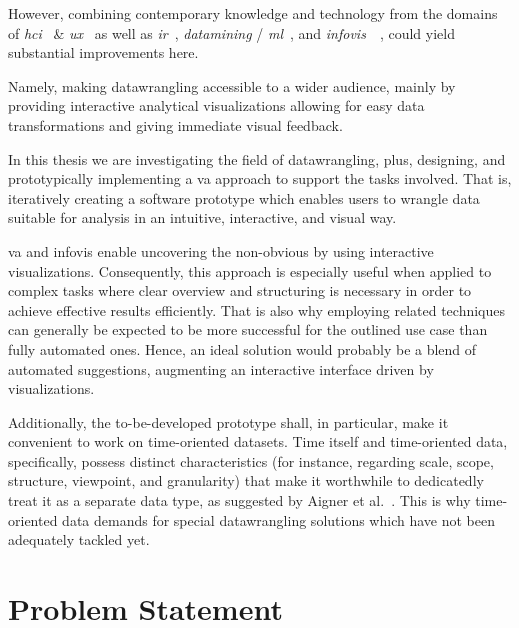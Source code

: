 However, combining contemporary knowledge and technology from the domains of \emph{\gls{hci}}~\cite{Cooper2004} \& \emph{\gls{ux}}~\cite{Norman2002} as well as \emph{\gls{ir}}~\cite{Manning2008}, \emph{\gls{datamining}} / \emph{\Gls{ml}}~\cite{Witten2011}, and \emph{\gls{infovis}}~\cite{Tufte2001}~\cite{Card1999}, could yield substantial improvements here.

Namely, making \gls{datawrangling} accessible to a wider audience, mainly by providing interactive analytical visualizations allowing for easy data transformations and giving immediate visual feedback.

In this thesis we are investigating the field of \gls{datawrangling}, plus, designing, and prototypically implementing a \gls{va} approach to support the tasks involved.
That is, iteratively creating a software prototype which enables users to wrangle data suitable for analysis in an intuitive, interactive, and visual way.

\Gls{va} and \gls{infovis} enable uncovering the non-obvious by using interactive visualizations.
Consequently, this approach is especially useful when applied to complex tasks where clear overview and structuring is necessary in order to achieve effective results efficiently.
That is also why employing related techniques can generally be expected to be more successful for the outlined use case than fully automated ones.
Hence, an ideal solution would probably be a blend of automated suggestions, augmenting an interactive interface driven by visualizations.

Additionally, the to-be-developed prototype shall, in particular, make it convenient to work on time-oriented datasets. Time itself and time-oriented data, specifically, possess distinct characteristics (for instance, regarding scale, scope, structure, viewpoint, and granularity) that make it worthwhile to dedicatedly treat it as a separate data type, as suggested by Aigner et al.~\cite{Aigner2011}.
This is why time-oriented data demands for special \gls{datawrangling} solutions which have not been adequately tackled yet.


\section{Problem Statement}

